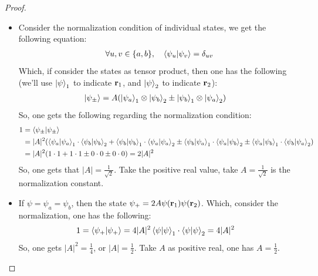 \documentclass{article}
\begin{document}
\begin{proof}
    
    \hfil

    \begin{itemize}
        \item[(a)] Consider the normalization condition of individual states, we get the following equation:
        \begin{align}
            \forall u,v\in\{a,b\},\quad \braket{\psi_u}{\psi_v} = \delta_{uv}
        \end{align}
        Which, if consider the states as tensor product, then one has the following (we'll use $\ket{\psi}_1$ to indicate $\mathbf{r}_1$, and $\ket{\psi}_2$ to indicate $\mathbf{r}_2$):
        \begin{align}
            \ket{\psi_\pm} &= A(\ket{\psi_a}_1\otimes \ket{\psi_b}_2\pm \ket{\psi_b}_1\otimes \ket{\psi_a}_2)
        \end{align}
        So, one gets the following regarding the normalization condition:
        \begin{align}
            1 &= \braket{\psi_\pm} \\
            &= |A|^2(\braket{\psi_a}_1\cdot \braket{\psi_b}_2 + \braket{\psi_b}_1\cdot \braket{\psi_a}_2 \pm \braket{\psi_b}{\psi_a}_1\cdot \braket{\psi_a}{\psi_b}_2 \pm \braket{\psi_a}{\psi_b}_1\cdot \braket{\psi_b}{\psi_a}_2)\\
            &= |A|^2(1\cdot 1+1\cdot 1\pm 0\cdot 0\pm 0\cdot 0) = 2|A|^2
        \end{align}
        So, one gets that $|A| = \frac{1}{\sqrt{2}}$. Take the positive real value, take $A = \frac{1}{\sqrt{2}}$ is the normalization constant.

        \hfil

        \item[(b)] If $\psi=\psi_a=\psi_b$, then the state $\psi_+ = 2A \psi(\mathbf{r}_1)\psi(\mathbf{r}_2)$. Which, consider the normalization, one has the following:
        \begin{align}
            1 &= \braket{\psi_+} = 4|A|^2\braket{\psi}_1\cdot \braket{\psi}_2 = 4|A|^2
        \end{align}
        So, one gets $|A|^2 = \frac{1}{4}$, or $|A| = \frac{1}{2}$. Take $A$ as positive real, one has $A = \frac{1}{2}$.
    \end{itemize}
\end{proof}

\newpage
\end{document}
